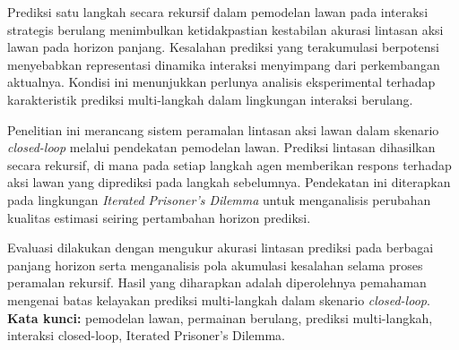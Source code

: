 \abstractind
Prediksi satu langkah secara rekursif dalam pemodelan lawan pada interaksi strategis berulang menimbulkan ketidakpastian kestabilan akurasi lintasan aksi lawan pada horizon panjang. Kesalahan prediksi yang terakumulasi berpotensi menyebabkan representasi dinamika interaksi menyimpang dari perkembangan aktualnya. Kondisi ini menunjukkan perlunya analisis eksperimental terhadap karakteristik prediksi multi-langkah dalam lingkungan interaksi berulang.

Penelitian ini merancang sistem peramalan lintasan aksi lawan dalam skenario \textit{closed-loop} melalui pendekatan pemodelan lawan. Prediksi lintasan dihasilkan secara rekursif, di mana pada setiap langkah agen memberikan respons terhadap aksi lawan yang diprediksi pada langkah sebelumnya. Pendekatan ini diterapkan pada lingkungan \textit{Iterated Prisoner's Dilemma} untuk menganalisis perubahan kualitas estimasi seiring pertambahan horizon prediksi.

Evaluasi dilakukan dengan mengukur akurasi lintasan prediksi pada berbagai panjang horizon serta menganalisis pola akumulasi kesalahan selama proses peramalan rekursif. Hasil yang diharapkan adalah diperolehnya pemahaman mengenai batas kelayakan prediksi multi-langkah dalam skenario \textit{closed-loop}.\\

\noindent\textbf{Kata kunci:} pemodelan lawan, permainan berulang, prediksi multi-langkah, interaksi closed-loop, Iterated Prisoner's Dilemma.
\endabstractind


